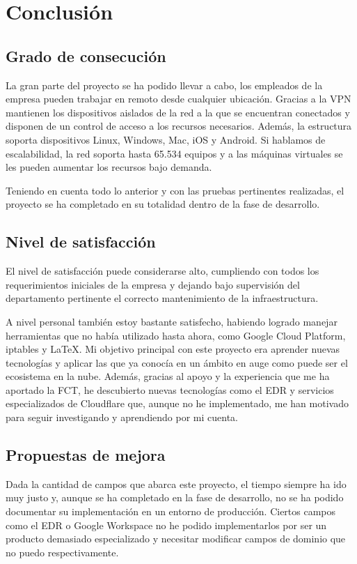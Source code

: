 \chapter{Conclusión}
\label{chapter:conclusion}
\section{Grado de consecución}
La gran parte del proyecto se ha podido llevar a cabo, los empleados de la empresa pueden trabajar en remoto desde cualquier ubicación. Gracias a la VPN mantienen los dispositivos aislados de la red a la que se encuentran conectados y disponen de un control de acceso a los recursos necesarios. Además, la estructura soporta dispositivos Linux, Windows, Mac, iOS y Android\cite{OpenVPNDevices}. Si hablamos de escalabilidad, la red soporta hasta 65.534 equipos y a las máquinas virtuales se les pueden aumentar los recursos bajo demanda.

Teniendo en cuenta todo lo anterior y con las pruebas pertinentes realizadas, el proyecto se ha completado en su totalidad dentro de la fase de desarrollo.

\section{Nivel de satisfacción}
El nivel de satisfacción puede considerarse alto, cumpliendo con todos los requerimientos iniciales de la empresa y dejando bajo supervisión del departamento pertinente el correcto mantenimiento de la infraestructura.

A nivel personal también estoy bastante satisfecho, habiendo logrado manejar herramientas que no  había utilizado hasta ahora, como Google Cloud Platform, iptables y \LaTeX. Mi objetivo principal con este proyecto era aprender nuevas tecnologías y aplicar las que ya conocía en un ámbito en auge como puede ser el ecosistema en la nube. Además, gracias al apoyo y la experiencia que me ha aportado la FCT, he descubierto nuevas tecnologías como el EDR y servicios especializados de Cloudflare que, aunque no he implementado, me han motivado para seguir investigando y aprendiendo por mi cuenta.

\section{Propuestas de mejora}

Dada la cantidad de campos que abarca este proyecto, el tiempo siempre ha ido muy justo y, aunque se ha completado en la fase de desarrollo, no se ha podido documentar su implementación en un entorno de producción. Ciertos campos como el EDR o Google Workspace no he podido implementarlos por ser un producto demasiado especializado y necesitar modificar campos de dominio que no puedo respectivamente. 